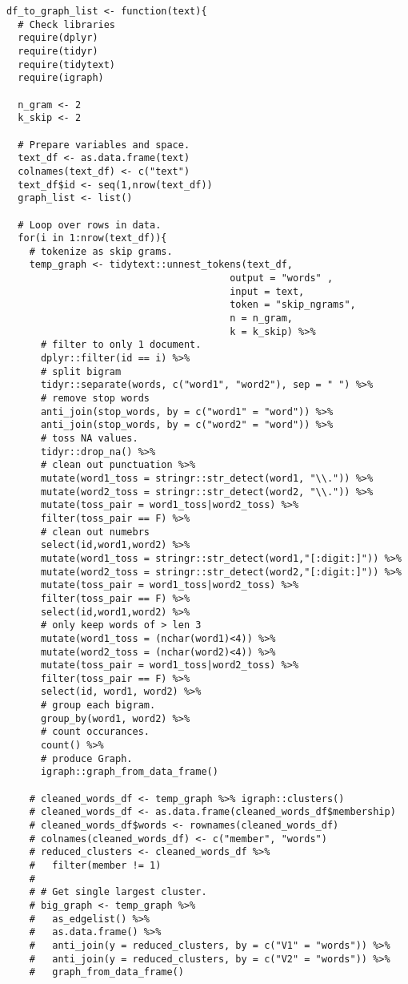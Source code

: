\begin{appendices}
\begin{lstlisting}
df_to_graph_list <- function(text){
  # Check libraries
  require(dplyr)
  require(tidyr)
  require(tidytext)
  require(igraph)
  
  n_gram <- 2
  k_skip <- 2
  
  # Prepare variables and space.
  text_df <- as.data.frame(text)
  colnames(text_df) <- c("text")
  text_df$id <- seq(1,nrow(text_df))
  graph_list <- list()
  
  # Loop over rows in data.
  for(i in 1:nrow(text_df)){
    # tokenize as skip grams.
    temp_graph <- tidytext::unnest_tokens(text_df, 
                                       output = "words" ,
                                       input = text, 
                                       token = "skip_ngrams",
                                       n = n_gram,
                                       k = k_skip) %>%  
      # filter to only 1 document.
      dplyr::filter(id == i) %>% 
      # split bigram
      tidyr::separate(words, c("word1", "word2"), sep = " ") %>%
      # remove stop words
      anti_join(stop_words, by = c("word1" = "word")) %>% 
      anti_join(stop_words, by = c("word2" = "word")) %>% 
      # toss NA values.
      tidyr::drop_na() %>% 
      # clean out punctuation %>% 
      mutate(word1_toss = stringr::str_detect(word1, "\\.")) %>% 
      mutate(word2_toss = stringr::str_detect(word2, "\\.")) %>% 
      mutate(toss_pair = word1_toss|word2_toss) %>% 
      filter(toss_pair == F) %>% 
      # clean out numebrs
      select(id,word1,word2) %>% 
      mutate(word1_toss = stringr::str_detect(word1,"[:digit:]")) %>% 
      mutate(word2_toss = stringr::str_detect(word2,"[:digit:]")) %>% 
      mutate(toss_pair = word1_toss|word2_toss) %>% 
      filter(toss_pair == F) %>% 
      select(id,word1,word2) %>% 
      # only keep words of > len 3
      mutate(word1_toss = (nchar(word1)<4)) %>% 
      mutate(word2_toss = (nchar(word2)<4)) %>% 
      mutate(toss_pair = word1_toss|word2_toss) %>% 
      filter(toss_pair == F) %>% 
      select(id, word1, word2) %>% 
      # group each bigram.
      group_by(word1, word2) %>% 
      # count occurances.
      count() %>% 
      # produce Graph.
      igraph::graph_from_data_frame()
    
    # cleaned_words_df <- temp_graph %>% igraph::clusters()
    # cleaned_words_df <- as.data.frame(cleaned_words_df$membership)
    # cleaned_words_df$words <- rownames(cleaned_words_df)
    # colnames(cleaned_words_df) <- c("member", "words")
    # reduced_clusters <- cleaned_words_df %>% 
    #   filter(member != 1)
    # 
    # # Get single largest cluster.
    # big_graph <- temp_graph %>% 
    #   as_edgelist() %>% 
    #   as.data.frame() %>% 
    #   anti_join(y = reduced_clusters, by = c("V1" = "words")) %>% 
    #   anti_join(y = reduced_clusters, by = c("V2" = "words")) %>% 
    #   graph_from_data_frame()
    

\end{lstlisting}
\end{appendices}
